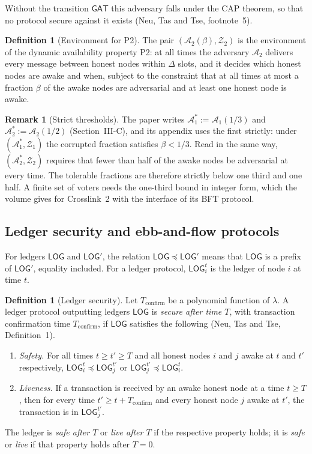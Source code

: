 \documentclass[11pt,a4paper]{article}
\theoremstyle{definition}
\newtheorem{definition}[theorem]{Definition}
\newtheorem{remark}[theorem]{Remark}
\newcommand{\Adv}{\mathcal{A}}
\newcommand{\LOG}{\mathsf{LOG}}
\newcommand{\GAT}{\mathsf{GAT}}
\newcommand{\Tconfirm}{T_{\mathrm{confirm}}}
\newcommand{\Env}{\mathcal{Z}}
\begin{document}
Without the transition $\GAT$ this adversary falls under the CAP theorem, so
that no protocol secure against it exists (Neu, Tas and Tse, footnote~5).

\begin{definition}[Environment for P2]\label{def:ntt-env2}
The pair $(\Adv_2(\beta), \Env_2)$ is the environment of the dynamic
availability property P2: at all times the adversary $\Adv_2$ delivers every
message between honest nodes within $\Delta$ slots, and it decides which
honest nodes are awake and when, subject to the constraint that at all times
at most a fraction $\beta$ of the awake nodes are adversarial and at least
one honest node is awake.
\end{definition}

\begin{remark}[Strict thresholds]\label{rem:ntt-strict}
The paper writes $\Adv_1^* := \Adv_1(1/3)$ and $\Adv_2^* := \Adv_2(1/2)$
(Section~III-C), and its appendix uses the first strictly: under
$(\Adv_1^*, \Env_1)$ the corrupted fraction satisfies $\beta < 1/3$. Read in
the same way, $(\Adv_2^*, \Env_2)$ requires that fewer than half of the awake
nodes be adversarial at every time. The tolerable fractions are therefore
strictly below one third and one half. A finite set of voters needs the
one-third bound in integer form, which the volume gives for Crosslink~2 with
the interface of its BFT protocol.
\end{remark}

\subsection{Ledger security and ebb-and-flow protocols}
\label{sec:model-security}

For ledgers $\LOG$ and $\LOG'$, the relation $\LOG \preceq \LOG'$ means that
$\LOG$ is a prefix of $\LOG'$, equality included. For a ledger protocol,
$\LOG_i^t$ is the ledger of node $i$ at time $t$.

\begin{definition}[Ledger security]\label{def:ntt-security}
Let $\Tconfirm$ be a polynomial function of $\lambda$. A ledger protocol
outputting ledgers $\LOG$ is \emph{secure after time $T$}, with transaction
confirmation time $\Tconfirm$, if $\LOG$ satisfies the following
(Neu, Tas and Tse, Definition~1).
\begin{enumerate}[label=(\roman*)]
\item \emph{Safety.} For all times $t \ge t' \ge T$ and all honest nodes $i$
  and $j$ awake at $t$ and $t'$ respectively, $\LOG_i^t \preceq \LOG_j^{t'}$ or
  $\LOG_j^{t'} \preceq \LOG_i^t$.
\item \emph{Liveness.} If a transaction is received by an awake honest node
  at a time $t \ge T$, then for every time $t' \ge t + \Tconfirm$ and every
  honest node $j$ awake at $t'$, the transaction is in $\LOG_j^{t'}$.
\end{enumerate}
The ledger is \emph{safe after $T$} or \emph{live after $T$} if the
respective property holds; it is \emph{safe} or \emph{live} if that property
holds after $T = 0$.
\end{definition}
\end{document}
